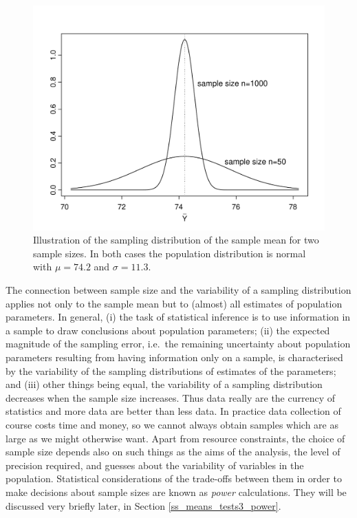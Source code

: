 \begin{figure}
\caption{Illustration of the sampling distribution of the sample mean
for two sample sizes. In both cases the population distribution is
normal with $\mu=74.2$ and $\sigma=11.3$.
}
\label{f_sampld2}
\vspace*{-2ex}
\begin{center}
\includegraphics[width=12cm]{sampld2_bp}
\end{center}
\vspace*{-3ex}
\end{figure}

The connection between sample size and the variability of a sampling
distribution applies not only to the sample mean but to (almost) all
estimates of population parameters. In general, (i) the task of
statistical inference is to use information in a sample to draw
conclusions about population parameters; (ii)
the expected magnitude of the sampling error, i.e.\
the remaining uncertainty about population parameters
resulting from having information only on a sample, is characterised by
the variability of the sampling distributions of estimates of the
parameters; and (iii) other things being equal, the variability of a
sampling distribution decreases when the sample size increases. Thus
data really are the currency of statistics and more data
are better than less data. In practice data collection of course costs
time and money, so we cannot always obtain samples which are as large as
we might otherwise want. Apart from resource constraints, the choice of
sample size depends also on such things as the aims of the
analysis, the level of precision required, and guesses about the
variability of variables in the population. Statistical
considerations of the trade-offs between them in order to make
decisions about sample sizes are known as
\emph{power} calculations. They will be discussed very briefly later, in
Section \ref{ss_means_tests3_power}.


